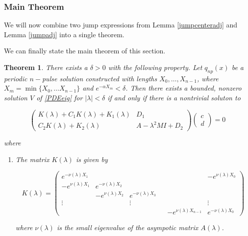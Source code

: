 \documentclass[12pt]{article}
\newtheorem{theorem}{Theorem}
\begin{document}
\subsubsection{Main Theorem}

We will now combine two jump expressions from Lemma \ref{jumpcenteradj} and Lemma \ref{jumpadj} into a single theorem.


We can finally state the main theorem of this section.

\begin{theorem}\label{blockmatrixtheorem}
There exists a $\delta > 0$ with the following property. Let $q_{np}(x)$ be a periodic $n-$pulse solution constructed with lengths $X_0, \dots, X_{n-1}$, where $X_m = \min\{ X_0, \dots X_{n-1}\}$ and $e^{-\alpha X_m} < \delta$. Then there exists a bounded, nonzero solution $V$ of \eqref{PDEeig} for $|\lambda| < \delta$ if and only if there is a nontrivial soluton to

\begin{equation}\label{blockeq}
\begin{pmatrix}
K(\lambda) + C_1 K(\lambda) + K_1(\lambda) & D_1 \\
C_2 K(\lambda) + K_2(\lambda) & A - \lambda^2 MI + D_2
\end{pmatrix}
\begin{pmatrix}c \\ d \end{pmatrix} 
= 0
\end{equation}

where 

\begin{enumerate}

\item The matrix $K(\lambda)$ is given by

\begin{equation}
K(\lambda) = 
\begin{pmatrix}
e^{-\nu(\lambda)X_1} & & & & & -e^{\nu(\lambda)X_0} \\
-e^{\nu(\lambda)X_1} & e^{-\nu(\lambda)X_2} \\
& -e^{\nu(\lambda)X_2} & e^{-\nu(\lambda)X_3} \\
\vdots & & \vdots & &&  \vdots \\
& & & & -e^{\nu(\lambda)X_{n-1}} & e^{-\nu(\lambda)X_0} 
\end{pmatrix}
\end{equation}

where $\nu(\lambda)$ is the small eigenvalue of the asympotic matrix $A(\lambda)$.


\end{enumerate}
\end{theorem}
\end{document}

